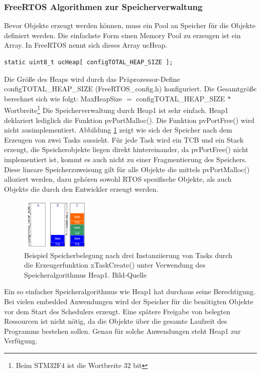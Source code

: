 \subsubsection{FreeRTOS Algorithmen zur Speicherverwaltung}
Bevor Objekte erzeugt werden können, muss ein Pool an Speicher für die Objekte definiert werden. Die einfachste Form einen Memory Pool zu erzeugen ist ein Array. In FreeRTOS nennt sich dieses Array ucHeap.
\begin{lstlisting}[label=lst:ucHeap, float=htb, numbers = none]
static uint8_t ucHeap[ configTOTAL_HEAP_SIZE ];
\end{lstlisting}
Die Größe des Heaps wird durch das Prä\-pro\-zes\-sor-Define configTOTAL\_HEAP\_SIZE (FreeRTOS\_config.h) konfiguriert. Die Gesamtgröße berechnet sich wie folgt:
\newline
\newline
MaxHeapSize $=$ configTOTAL\_HEAP\_SIZE $\ast$ Wortbreite\footnote{Beim STM32F4 ist die Wortbreite 32 bit} 
\newline
\newline
Die Speicherverwaltung durch Heap1 ist sehr einfach. Heap1 deklariert lediglich die Funktion pvPortMalloc(). Die Funktion pvPortFree() wird nicht ausimplementiert. Abbildung \ref{fig:Heap1} zeigt wie sich der Speicher nach dem Erzeugen von zwei Tasks aussieht. Für jede Task wird ein TCB und ein Stack erzeugt, die Speicherobjekte liegen direkt hintereinander, da pvPortFree() nicht implementiert ist, kommt es auch nicht zu einer Fragmentierung des Speichers. Diese lineare Speicherzuweisung gilt für alle Objekte die mittels pvPortMalloc() alloziert werden, dazu gehören sowohl RTOS spezifische Objekte, als auch Objekte die durch den Entwickler erzeugt werden. 
\begin{figure}[htb]
	\centering
		\includegraphics[width=0.3\textwidth]{Pictures/FreeRTOSOrg/heap1Alg.png}
	\caption{Beispiel Speicherbelegung nach drei Instanziierung von Tasks durch die Erzeugerfunktion xTaskCreate() unter Verwendung des Speicheralgorithmus Heap1. Bild-Quelle~\protect{}}
	\label{fig:Heap1}
\end{figure}
Ein so einfacher Speicheralgorithmus wie Heap1 hat durchaus seine Berechtigung. Bei vielen embedded Anwendungen wird der Speicher für die benötigten Objekte vor dem Start des Schedulers erzeugt. Eine spätere Freigabe von belegten Ressourcen ist nicht nötig, da die Objekte über die gesamte Laufzeit des Programms bestehen sollen. Genau für solche Anwendungen steht Heap1 zur Verfügung. 
